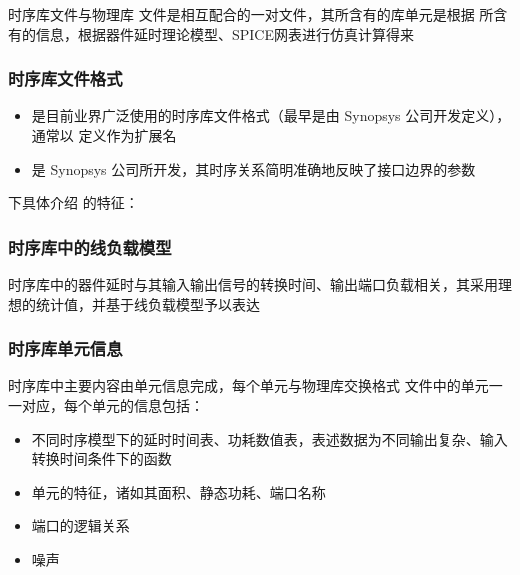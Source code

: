 \documentclass[letterpaper,10pt,english]{sphinxmanual}
\begin{document}
\sphinxAtStartPar
时序库文件与物理库  文件是相互配合的一对文件，其所含有的库单元是根据  所含有的信息，根据器件延时理论模型、SPICE网表进行仿真计算得来


\subsubsection{时序库文件格式}
\label{\detokenize{chapter2/_u65f6_u5e8f_u5e93_u6587_u4ef6:id3}}\begin{itemize}
\item {} 
\sphinxAtStartPar
{} 是目前业界广泛使用的时序库文件格式（最早是由 Synopsys 公司开发定义），通常以  定义作为扩展名

\item {} 
\sphinxAtStartPar
{} 是 Synopsys 公司所开发，其时序关系简明准确地反映了接口边界的参数

\end{itemize}

\sphinxAtStartPar
下具体介绍  的特征：


\subsubsection{时序库中的线负载模型}
\label{\detokenize{chapter2/_u65f6_u5e8f_u5e93_u6587_u4ef6:id4}}
\sphinxAtStartPar
时序库中的器件延时与其输入输出信号的转换时间、输出端口负载相关，其采用理想的统计值，并基于线负载模型予以表达


\subsubsection{时序库单元信息}
\label{\detokenize{chapter2/_u65f6_u5e8f_u5e93_u6587_u4ef6:id5}}
\sphinxAtStartPar
时序库中主要内容由单元信息完成，每个单元与物理库交换格式  文件中的单元一一对应，每个单元的信息包括：
\begin{itemize}
\item {} 
\sphinxAtStartPar
不同时序模型下的延时时间表、功耗数值表，表述数据为不同输出复杂、输入转换时间条件下的函数

\item {} 
\sphinxAtStartPar
单元的特征，诸如其面积、静态功耗、端口名称

\item {} 
\sphinxAtStartPar
端口的逻辑关系

\item {} 
\sphinxAtStartPar
噪声

\end{itemize}
\end{document}
